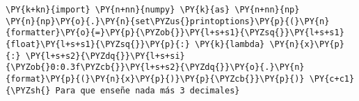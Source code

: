 \begin{tcolorbox}[breakable, size=fbox, boxrule=1pt, pad at break*=1mm,colback=cellbackground, colframe=cellborder]
\begin{Verbatim}[commandchars=\\\{\}]
\PY{k+kn}{import} \PY{n+nn}{numpy} \PY{k}{as} \PY{n+nn}{np}
\PY{n}{np}\PY{o}{.}\PY{n}{set\PYZus{}printoptions}\PY{p}{(}\PY{n}{formatter}\PY{o}{=}\PY{p}{\PYZob{}}\PY{l+s+s1}{\PYZsq{}}\PY{l+s+s1}{float}\PY{l+s+s1}{\PYZsq{}}\PY{p}{:} \PY{k}{lambda} \PY{n}{x}\PY{p}{:} \PY{l+s+s2}{\PYZdq{}}\PY{l+s+si}{\PYZob{}0:0.3f\PYZcb{}}\PY{l+s+s2}{\PYZdq{}}\PY{o}{.}\PY{n}{format}\PY{p}{(}\PY{n}{x}\PY{p}{)}\PY{p}{\PYZcb{}}\PY{p}{)} \PY{c+c1}{\PYZsh{} Para que enseñe nada más 3 decimales}
\end{Verbatim}
\end{tcolorbox}

